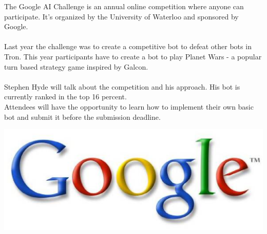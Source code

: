 \documentclass{article}
\begin{document}


The Google AI Challenge is an annual online competition where anyone can participate.
It's organized by the University of Waterloo and sponsored by Google.\\
\\
Last year the challenge was to create a competitive bot to defeat other bots in Tron.
This year participants have to create a bot to play Planet Wars - a popular turn based strategy game inspired by Galcon.\\
\\
Stephen Hyde will talk about the competition and his approach. His bot is currently ranked in the top 16 percent.\\
Attendees will have the opportunity to learn how to implement their own basic bot and submit it before the submission deadline.\\

\begin{center}
\includegraphics[scale=0.3]{google.eps}
\end{center}
\end{document}

